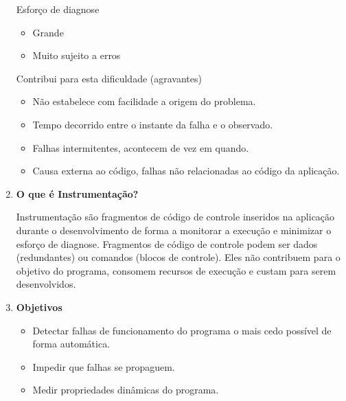 \documentclass[
	12pt, %
]{fphw}
\begin{document}
\begin{doublespace}
\begin{enumerate}[label=\textbf{\arabic*)}]
              Esforço de diagnose

              \begin{itemize}

                  \item Grande
                  \item Muito sujeito a erros

              \end{itemize}

              Contribui para esta dificuldade (agravantes)

              \begin{itemize}

                  \item Não estabelece com facilidade a origem do problema.
                  \item Tempo decorrido entre o instante da falha e o observado.
                  \item Falhas intermitentes, acontecem de vez em quando.
                  \item Causa externa ao código, falhas não relacionadas ao código da aplicação.

              \end{itemize}

        \item \textbf{O que é Instrumentação?}

              Instrumentação são fragmentos de código de controle inseridos na aplicação durante o desenvolvimento de forma a monitorar a execução e minimizar o esforço de diagnose. Fragmentos de código de controle podem ser dados (redundantes) ou comandos (blocos de controle). Eles não contribuem para o objetivo do programa, consomem recursos de execução e custam para serem desenvolvidos.

        \item \textbf{Objetivos}

              \begin{itemize}

                  \item Detectar falhas de funcionamento do programa o mais cedo possível de forma automática.
                  \item Impedir que falhas se propaguem.
                  \item Medir propriedades dinâmicas do programa.

              \end{itemize}


\end{enumerate}
\end{doublespace}
\end{document}
